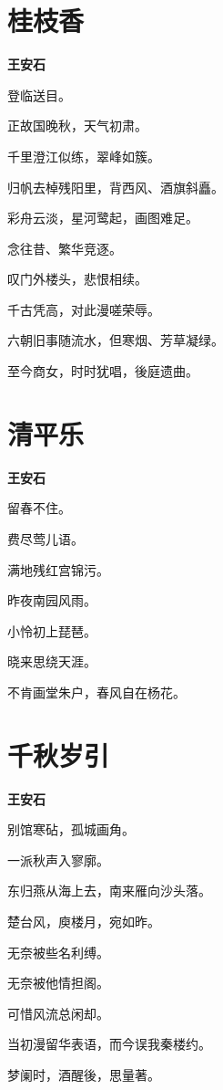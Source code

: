 \documentclass[12pt,a4paper]{ctexbook}
\begin{document}
\section{桂枝香}
\textbf{王安石}\par\vspace{0.5em}
登临送目。\par
正故国晚秋，天气初肃。\par
千里澄江似练，翠峰如簇。\par
归帆去棹残阳里，背西风、酒旗斜矗。\par
彩舟云淡，星河鹭起，画图难足。\par
念往昔、繁华竞逐。\par
叹门外楼头，悲恨相续。\par
千古凭高，对此漫嗟荣辱。\par
六朝旧事随流水，但寒烟、芳草凝绿。\par
至今商女，时时犹唱，後庭遗曲。\par

\section{清平乐}
\textbf{王安石}\par\vspace{0.5em}
留春不住。\par
费尽莺儿语。\par
满地残红宫锦污。\par
昨夜南园风雨。\par
小怜初上琵琶。\par
晓来思绕天涯。\par
不肯画堂朱户，春风自在杨花。\par

\section{千秋岁引}
\textbf{王安石}\par\vspace{0.5em}
别馆寒砧，孤城画角。\par
一派秋声入寥廓。\par
东归燕从海上去，南来雁向沙头落。\par
楚台风，庾楼月，宛如昨。\par
无奈被些名利缚。\par
无奈被他情担阁。\par
可惜风流总闲却。\par
当初漫留华表语，而今误我秦楼约。\par
梦阑时，酒醒後，思量著。\par
\end{document}
